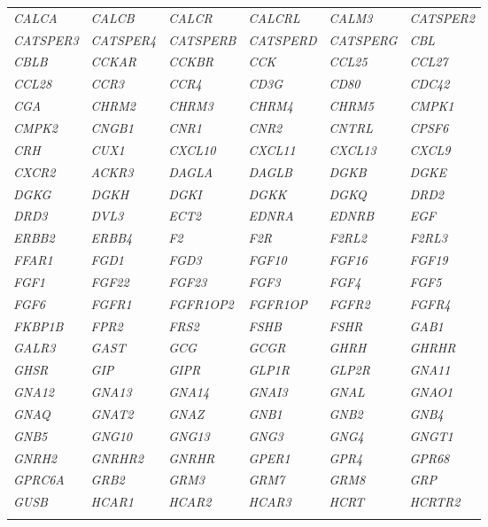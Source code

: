 \begin{longtable}{>{\em}l>{\em}l>{\em}l>{\em}l>{\em}l>{\em}l}
  \rowcolor{black!10} 
  CALCA & CALCB & CALCR & CALCRL & CALM3 & CATSPER2 \\ 
  \rowcolor{black!5} 
  CATSPER3 & CATSPER4 & CATSPERB & CATSPERD & CATSPERG & CBL \\ 
  \rowcolor{black!10} 
  CBLB & CCKAR & CCKBR & CCK & CCL25 & CCL27 \\ 
  \rowcolor{black!5} 
  CCL28 & CCR3 & CCR4 & CD3G & CD80 & CDC42 \\ 
  \rowcolor{black!10} 
  CGA & CHRM2 & CHRM3 & CHRM4 & CHRM5 & CMPK1 \\ 
  \rowcolor{black!5} 
  CMPK2 & CNGB1 & CNR1 & CNR2 & CNTRL & CPSF6 \\ 
  \rowcolor{black!10} 
  CRH & CUX1 & CXCL10 & CXCL11 & CXCL13 & CXCL9 \\ 
  \rowcolor{black!5} 
  CXCR2 & ACKR3 & DAGLA & DAGLB & DGKB & DGKE \\ 
  \rowcolor{black!10} 
  DGKG & DGKH & DGKI & DGKK & DGKQ & DRD2 \\ 
  \rowcolor{black!5} 
  DRD3 & DVL3 & ECT2 & EDNRA & EDNRB & EGF \\ 
  \rowcolor{black!10} 
  ERBB2 & ERBB4 & F2 & F2R & F2RL2 & F2RL3 \\ 
  \rowcolor{black!5} 
  FFAR1 & FGD1 & FGD3 & FGF10 & FGF16 & FGF19 \\ 
  \rowcolor{black!10} 
  FGF1 & FGF22 & FGF23 & FGF3 & FGF4 & FGF5 \\ 
  \rowcolor{black!5} 
  FGF6 & FGFR1 & FGFR1OP2 & FGFR1OP & FGFR2 & FGFR4 \\ 
  \rowcolor{black!10} 
  FKBP1B & FPR2 & FRS2 & FSHB & FSHR & GAB1 \\ 
  \rowcolor{black!5} 
  GALR3 & GAST & GCG & GCGR & GHRH & GHRHR \\ 
  \rowcolor{black!10} 
  GHSR & GIP & GIPR & GLP1R & GLP2R & GNA11 \\ 
  \rowcolor{black!5} 
  GNA12 & GNA13 & GNA14 & GNAI3 & GNAL & GNAO1 \\ 
  \rowcolor{black!10} 
  GNAQ & GNAT2 & GNAZ & GNB1 & GNB2 & GNB4 \\ 
  \rowcolor{black!5} 
  GNB5 & GNG10 & GNG13 & GNG3 & GNG4 & GNGT1 \\ 
  \rowcolor{black!10} 
  GNRH2 & GNRHR2 & GNRHR & GPER1 & GPR4 & GPR68 \\ 
  \rowcolor{black!5} 
  GPRC6A & GRB2 & GRM3 & GRM7 & GRM8 & GRP \\ 
  \rowcolor{black!10} 
  GUSB & HCAR1 & HCAR2 & HCAR3 & HCRT & HCRTR2 \\ 
  \rowcolor{black!5} 

\end{longtable}
